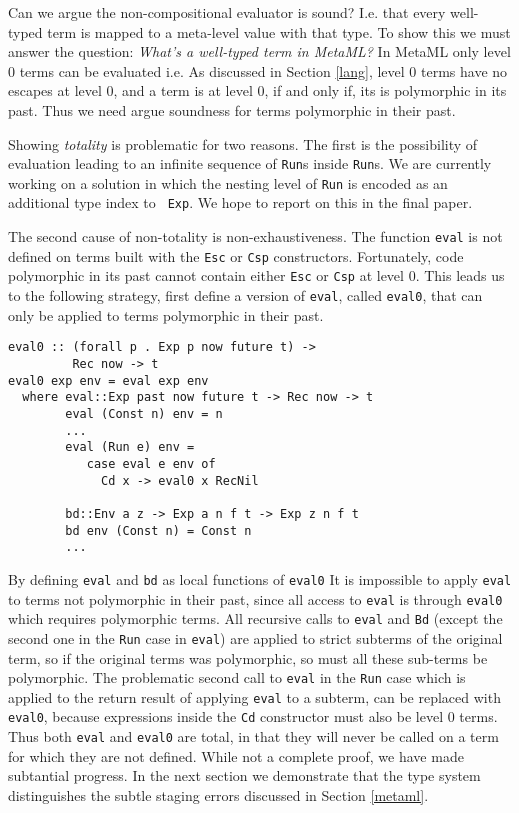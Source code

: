 \documentclass{sigplanconf}
\begin{document}
Can we argue the non-compositional evaluator is sound? I.e. that every
well-typed term is mapped to a meta-level value with that type. To show
this we must answer the question: {\em What's a well-typed term in
MetaML?} In MetaML only level 0 terms can be evaluated i.e. As discussed
in Section \ref{lang}, level 0 terms have no escapes at level 0, and a
term is at level 0, if and only if, its is polymorphic in its past. Thus
we need argue soundness for terms polymorphic in their past.

Showing {\em totality} is problematic for two reasons. The first is the
possibility of evaluation leading to an infinite sequence of {\tt Run}s
inside {\tt Run}s. We are currently working on  a solution in which the
nesting level of {\tt Run} is encoded as an additional type index to {\tt
Exp}. We hope to report on this
in the final paper.

The second cause of non-totality is non-exhaustiveness. The function
{\tt eval} is not defined on terms built with the {\tt Esc} or {\tt Csp}
constructors. Fortunately, code polymorphic in its past cannot contain
either {\tt Esc} or {\tt Csp} at level 0. This leads us to the following
strategy, first define a version of {\tt eval}, called {\tt eval0}, that
can only be applied to terms polymorphic in their past.
 
\begin{verbatim}
eval0 :: (forall p . Exp p now future t) -> 
         Rec now -> t
eval0 exp env = eval exp env
  where eval::Exp past now future t -> Rec now -> t
        eval (Const n) env = n
        ...
        eval (Run e) env = 
           case eval e env of 
             Cd x -> eval0 x RecNil 
             
        bd::Env a z -> Exp a n f t -> Exp z n f t
        bd env (Const n) = Const n 
        ...
\end{verbatim}
By defining {\tt eval} and {\tt bd} as local functions of {\tt eval0}
It is impossible to apply {\tt eval} to terms not polymorphic in
their past, since all access to {\tt eval} is through {\tt eval0}
which requires polymorphic terms. All recursive calls to {\tt eval} and
{\tt Bd}
(except the second one in the {\tt Run} case in {\tt eval}) are applied to strict
subterms of the original term, so if the original terms was
polymorphic, so must all these sub-terms be polymorphic. The
problematic second call to {\tt eval} in the {\tt Run} case
which is applied to the return result of applying {\tt eval} to a 
subterm, can be replaced with {\tt eval0}, because expressions
inside the {\tt Cd} constructor must also be level 0 terms.
Thus both {\tt eval} and {\tt eval0}
are total, in that they will never be called on a term for
which they are not defined. 
While not a complete proof, we have made subtantial progress.
In the next section we demonstrate that the type system distinguishes
the subtle staging errors discussed in Section \ref{metaml}.
\end{document}
